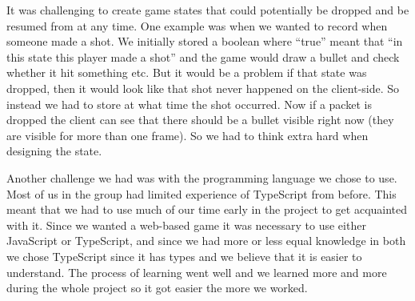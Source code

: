 \documentclass[a4paper]{article}
\begin{document}
It was challenging to create game states that could potentially be dropped and be resumed from at any time. One example was when we wanted to record when someone made a shot. We initially stored a boolean where ``true'' meant that ``in this state this player made a shot'' and the game would draw a bullet and check whether it hit something etc. But it would be a problem if that state was dropped, then it would look like that shot never happened on the client-side. So instead we had to store at what time the shot occurred. Now if a packet is dropped the client can see that there should be a bullet visible right now (they are visible for more than one frame). So we had to think extra hard when designing the state.

Another challenge we had was with the programming language we chose to use. Most of us in the group had limited experience of TypeScript from before. This meant that we had to use much of our time early in the project to get acquainted with it. Since we wanted a web-based game it was necessary to use either JavaScript or TypeScript, and since we had more or less equal knowledge in both we chose TypeScript since it has types and we believe that it is easier to understand. The process of learning went well and we learned more and more during the whole project so it got easier the more we worked.

\newpage
% 
%
\printbibliography
\end{document}
